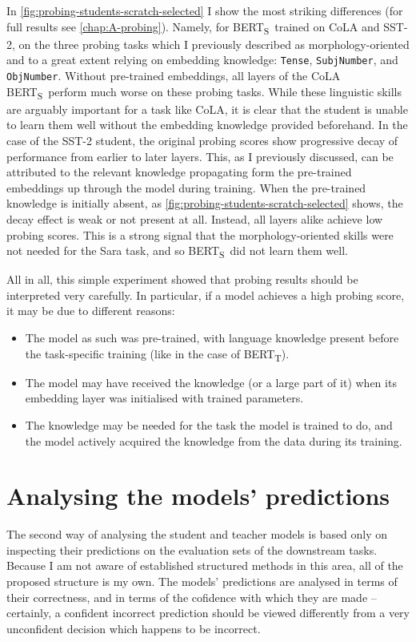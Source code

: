 \documentclass[bsc,frontabs,singlespacing,parskip,deptreport]{infthesis}
\def\BERTT{BERT\textsubscript{T}}
\def\BERTS{BERT\textsubscript{S}}
\begin{document}
{{{      In \autoref{fig:probing-students-scratch-selected} I show the most striking differences (for full results see \autoref{chap:A-probing}). Namely, for \BERTS~trained on CoLA and SST-2, on the three probing tasks which I previously described as morphology-oriented and to a great extent relying on embedding knowledge: \verb|Tense|, \verb|SubjNumber|, and \verb|ObjNumber|.
      Without pre-trained embeddings, all layers of the CoLA \BERTS~perform much worse on these probing tasks. While these linguistic skills are arguably important for a task like CoLA, it is clear that the student is unable to learn them well without the embedding knowledge provided beforehand.
      In the case of the SST-2 student, the original probing scores show progressive decay of performance from earlier to later layers. This, as I previously discussed, can be attributed to the relevant knowledge propagating form the pre-trained embeddings up through the model during training. When the pre-trained knowledge is initially absent, as \autoref{fig:probing-students-scratch-selected} shows, the decay effect is weak or not present at all. Instead, all layers alike achieve low probing scores. This is a strong signal that the morphology-oriented skills were not needed for the Sara task, and so \BERTS~did not learn them well.

      All in all, this simple experiment showed that probing results should be interpreted very carefully. In particular, if a model achieves a high probing score, it may be due to different reasons:
      \begin{itemize}
        \item The model as such was pre-trained, with language knowledge present before the task-specific training (like in the case of \BERTT).
        \item The model may have received the knowledge (or a large part of it) when its embedding layer was initialised with trained parameters.
        \item The knowledge may be needed for the task the model is trained to do, and the model actively acquired the knowledge from the data during its training.
      \end{itemize}
    }
  }

  \section{Analysing the models' predictions}{
    The second way of analysing the student and teacher models is based only on inspecting their predictions on the evaluation sets of the downstream tasks.
    Because I am not aware of established structured methods in this area, all of the proposed structure is my own.
    The models' predictions are analysed in terms of their correctness, and in terms of the cofidence with which they are made -- certainly, a confident incorrect prediction should be viewed differently from a very unconfident decision which happens to be incorrect.

}}
\end{document}
